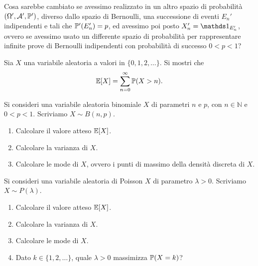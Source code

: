 Cosa sarebbe cambiato se avessimo realizzato in un altro spazio di probabilità $( \Omega ' ,\mathcal{A} ' ,\mathbb{P} ' )$, diverso dallo spazio di Bernoulli, una successione di eventi $E_{n} ' $ indipendenti e tali che $\mathbb{P} ' ( E_{n} ' ) =p$, ed avessimo poi posto $X_{n} ' =\Ind_{E_{n} ' }$, ovvero se avessimo usato un differente spazio di probabilità per rappresentare infinite prove di Bernoulli indipendenti con probabilità di successo $0< p< 1$?

\Esercizio{$\star$}

Sia $X$ una variabile aleatoria a valori in $\{0,1,2,\dots \}$. Si mostri che
\begin{equation*}
\mathbb{E}[ X] =\sum\limits _{n=0}^{\infty }\mathbb{P}( X >n) .
\end{equation*}


Si consideri una variabile aleatoria binomiale $X$ di parametri $n$ e $p$, con $n\in \mathbb{N}$ e $0< p< 1$. Scriviamo $X\sim B( n,p)$.
\begin{enumerate}
\item Calcolare il valore atteso $\mathbb{E}[ X]$.
\item Calcolare la varianza di $X$.
\item Calcolare le mode di $X$, ovvero i punti di massimo della densità discreta di $X$.
\end{enumerate}


Si consideri una variabile aleatoria di Poisson $X$ di parametro $\lambda  >0$. Scriviamo $X\sim P( \lambda )$.
\begin{enumerate}
\item Calcolare il valore atteso $\mathbb{E}[ X]$.
\item Calcolare la varianza di $X$.
\item Calcolare le mode di $X$.
\item Dato $k\in \{1,2,\dots \}$, quale $\lambda  >0$ massimizza $\mathbb{P}( X=k)$?
\end{enumerate}


